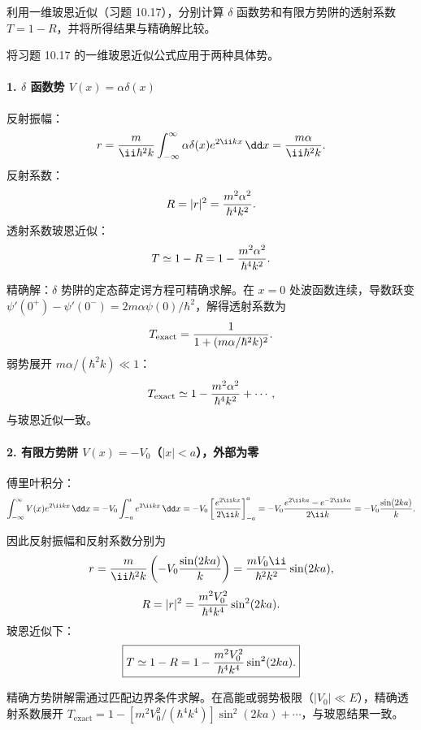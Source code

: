 \begin{question}
利用一维玻恩近似（习题 10.17），分别计算 $\delta$ 函数势和有限方势阱的透射系数 $T=1-R$，并将所得结果与精确解比较。
\end{question}
\begin{solution}
将习题 10.17 的一维玻恩近似公式应用于两种具体势。

\paragraph{1. $\delta$ 函数势 $V(x)=\alpha\delta(x)$}

反射振幅：
\[
r={m\over\ii\hbar^2k}\int_{-\infty}^{\infty}\alpha\delta(x)e^{2\ii kx}\,\dd x
={m\alpha\over\ii\hbar^2k}.
\]
反射系数：
\[
R=|r|^2={m^2\alpha^2\over\hbar^4k^2}.
\]
透射系数玻恩近似：
\[
T\simeq1-R=1-{m^2\alpha^2\over\hbar^4k^2}.
\]

精确解：$\delta$ 势阱的定态薛定谔方程可精确求解。在 $x=0$ 处波函数连续，导数跃变 $\psi'(0^+)-\psi'(0^-)=2m\alpha\psi(0)/\hbar^2$，解得透射系数为
\[
T_{\text{exact}}={1\over1+(m\alpha/\hbar^2k)^2}.
\]
弱势展开 $m\alpha/(\hbar^2k)\ll1$：
\[
T_{\text{exact}}\simeq 1-{m^2\alpha^2\over\hbar^4k^2}+\cdots,
\]
与玻恩近似一致。

\paragraph{2. 有限方势阱 $V(x)=-V_0$（$|x|<a$），外部为零}

傅里叶积分：
\[
\int_{-\infty}^{\infty}V(x)e^{2\ii kx}\,\dd x
=-V_0\int_{-a}^{a}e^{2\ii kx}\,\dd x
=-V_0\left[{e^{2\ii kx}\over2\ii k}\right]_{-a}^{a}
=-V_0{e^{2\ii ka}-e^{-2\ii ka}\over2\ii k}
=-V_0{\sin(2ka)\over k}.
\]

因此反射振幅和反射系数分别为
\[
r={m\over\ii\hbar^2k}\left(-V_0{\sin(2ka)\over k}\right)
={m V_0\ii\over\hbar^2k^2}\sin(2ka),
\]
\[
R=|r|^2={m^2 V_0^2\over\hbar^4k^4}\sin^2(2ka).
\]
玻恩近似下：
\[
\boxed{T\simeq1-R=1-{m^2 V_0^2\over\hbar^4k^4}\sin^2(2ka).}
\]

精确方势阱解需通过匹配边界条件求解。在高能或弱势极限（$|V_0|\ll E$），精确透射系数展开 $T_{\text{exact}}=1-[m^2V_0^2/(\hbar^4k^4)]\sin^2(2ka)+\cdots$，与玻恩结果一致。
\end{solution}


